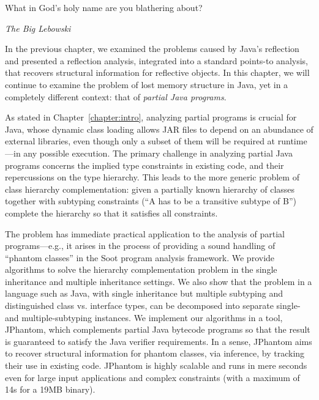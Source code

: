 \label{chapter:hiercomp}
\epigraph{What in God's holy name are you blathering
  about?}{\textit{The Big Lebowski}}

In the previous chapter, we examined the problems caused by Java's
reflection and presented a reflection analysis, integrated into a
standard points-to analysis, that recovers structural information for
reflective objects. In this chapter, we will continue to examine the
problem of lost memory structure in Java, yet in a completely
different context: that of \emph{partial Java programs}.

As stated in Chapter~\ref{chapter:intro}, analyzing partial programs
is crucial for Java, whose dynamic class loading allows JAR files to
depend on an abundance of external libraries, even though only a
subset of them will be required at runtime---in any possible
execution. The primary challenge in analyzing partial Java programs
concerns the implied type constraints in existing code, and their
repercussions on the type hierarchy.
This leads to the more generic problem of class hierarchy
complementation: given a partially known hierarchy of classes together
with subtyping constraints (``A has to be a transitive subtype of B'')
complete the hierarchy so that it satisfies all constraints.

The problem has immediate practical application to the analysis of
partial programs---e.g., it arises in the process of providing a sound
handling of ``phantom classes'' in the Soot program analysis
framework. We provide algorithms to solve the hierarchy
complementation problem in the single inheritance and multiple
inheritance settings.
We also show that the problem in a language such as Java, with single
inheritance but multiple subtyping and distinguished class
vs. interface types, can be decomposed into separate single- and
multiple-subtyping instances.  We implement our algorithms in a tool,
JPhantom, which complements partial Java bytecode programs so that the
result is guaranteed to satisfy the Java verifier requirements. In a
sense, JPhantom aims to recover structural information for phantom
classes, via inference, by tracking their use in existing
code. JPhantom is highly scalable and runs in mere seconds even for
large input applications and complex constraints (with a maximum of
14s for a 19MB binary).

